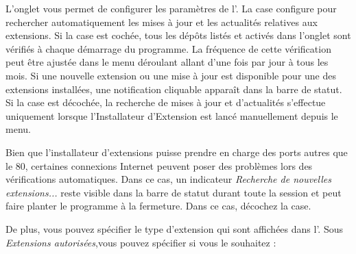 L'onglet  vous permet de configurer les paramètres de l'. La case  configure \qg pour rechercher automatiquement les mises à jour et les actualités relatives aux extensions. Si la case est cochée, tous les dépôts listés et activés dans l'onglet  sont vérifiés à chaque démarrage du programme. La fréquence de cette vérification peut être ajustée dans le menu déroulant allant d'une fois par jour à tous les mois. Si une nouvelle extension ou une mise à jour est disponible pour une des extensions installées, une notification cliquable apparaît dans la barre de statut. Si la case est décochée, la recherche de mises à jour et d'actualités s'effectue uniquement lorsque l'Installateur d'Extension est lancé manuellement depuis le menu.

Bien que l'installateur d'extensions puisse prendre en charge des ports autres que le 80, certaines connexions Internet peuvent poser des problèmes lors des vérifications automatiques. Dans ce cas, un indicateur \textit{Recherche de nouvelles extensions...} reste visible dans la barre de statut durant toute la session \qg et peut faire planter le programme à la fermeture. Dans ce cas, décochez la case.

De plus, vous pouvez spécifier le type d'extension qui sont affichées dans l'. Sous \textit{Extensions autorisées},vous pouvez spécifier si vous le souhaitez :

